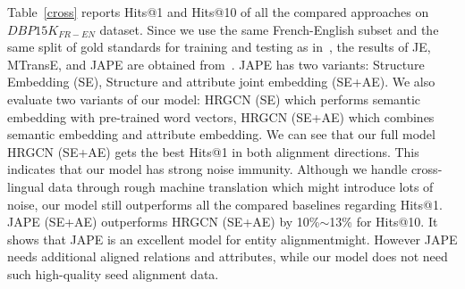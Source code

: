 	Table~\ref{cross} reports Hits@1 and Hits@10 of all the compared approaches on $DBP15K_{FR-EN}$ dataset. Since we use the same French-English subset and the same split of gold standards for training and testing as in~\cite{sun2017cross}, the results of JE, MTransE, and JAPE are obtained from~\cite{sun2017cross}. JAPE has two variants: Structure Embedding (SE), Structure and attribute joint embedding (SE+AE). We also evaluate two variants of our model: HRGCN (SE) which performs semantic embedding with pre-trained word vectors, HRGCN (SE+AE) which combines semantic embedding and attribute embedding. We can see that our full model HRGCN (SE+AE) gets the best Hits@1 in both alignment directions. This indicates that our model has strong noise immunity. Although we handle cross-lingual data through rough machine translation which might introduce lots of noise, our model still outperforms all the compared baselines regarding Hits@1. JAPE (SE+AE) outperforms HRGCN (SE+AE) by 10\%$\sim$13\% for Hits@10. It shows that JAPE is an
	excellent model for entity alignmentmight. However JAPE needs additional aligned relations and attributes, while our model does not need such high-quality seed alignment data.
	
